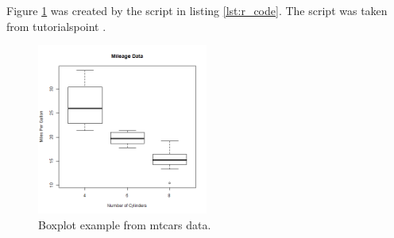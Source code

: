 \documentclass[a4paper]{article}
\begin{document}
Figure \ref{fig:rboxplot} was created by the script in listing \ref{lst:r_code}. The script was taken from tutorialspoint \cite{Rboxplot}.
\begin{figure}[h]
\begin{center}
\includegraphics[width=0.5\textwidth]{boxplot}
\caption{Boxplot example from mtcars data.}
\label{fig:rboxplot}
\end{center}
\end{figure}





\end{document}
